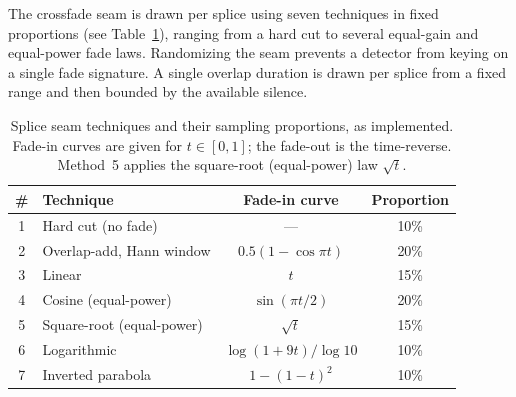 \documentclass[11pt]{article}
\begin{document}
The crossfade seam is drawn per splice using seven techniques in fixed
proportions (see Table~\ref{tab:splice}), ranging from a hard cut to several
equal-gain and equal-power fade laws. Randomizing the seam prevents a
detector from keying on a single fade signature. A single overlap
duration is drawn per splice from a fixed range and then bounded by the
available silence.


\begin{table}[H]
\centering
\caption{Splice seam techniques and their sampling
proportions, as implemented. Fade-in curves are given for
$t\in[0,1]$; the fade-out is the time-reverse. Method~5 applies the
square-root (equal-power) law $\sqrt{t}$.}
\label{tab:splice}
\small
\begin{tabular}{clcc}
\toprule
\textbf{\#} & \textbf{Technique} & \textbf{Fade-in curve} & \textbf{Proportion} \\
\midrule
1 & Hard cut (no fade)          & ---                       & 10\% \\
2 & Overlap-add, Hann window    & $0.5(1-\cos\pi t)$        & 20\% \\
3 & Linear                      & $t$                       & 15\% \\
4 & Cosine (equal-power)        & $\sin(\pi t/2)$           & 20\% \\
5 & Square-root (equal-power)   & $\sqrt{t}$                & 15\% \\
6 & Logarithmic                 & $\log(1+9t)/\log 10$      & 10\% \\
7 & Inverted parabola           & $1-(1-t)^2$               & 10\% \\
\bottomrule
\end{tabular}
\end{table}
\end{document}
